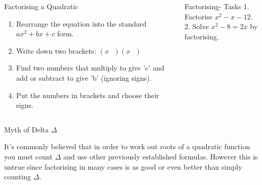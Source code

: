 \documentclass[final]{beamer}
\newlength{\onecolwid}
\newlength{\twocolwid}
\begin{document}
\begin{frame}[t]
\begin{columns}[t]
\begin{column}{\twocolwid}
\begin{columns}[t,totalwidth=\twocolwid]
\begin{column}{\onecolwid}
\begin{block}{Factorising a Quadratic}
\begin{enumerate}
\item Rearrange the equation into the standard $ax^2+bx+c$ form.
\item Write down two brackets: $(x\ \ \ )(x\ \ \ )$
\item Find two numbers that multiply to give 'c' and add or subtract to give 'b' (ignoring signs).
\item Put the numbers in brackets and choose their signs.
\end{enumerate}

\end{block}


\end{column} %

\begin{column}{\onecolwid}\vspace{-.6in} %


\begin{block}{Factorising- Tasks}
1. Factorise $x^2-x-12$.
\[\]
\[\]
\[\]
\[\]
2. Solve $x^2-8=2x$ by factorising.

\end{block}


\end{column} %

\end{columns} %


\begin{alertblock}{Myth of Delta $\Delta$}

It's commonly believed that in order to work out roots of a quadratic function you must count $\Delta$ and use other previously established formulas. However this is untrue since factorising in many cases is as good or even better than simply counting $\Delta$.


\end{alertblock}
\end{column}
\end{columns}
\end{frame}
\end{document}
